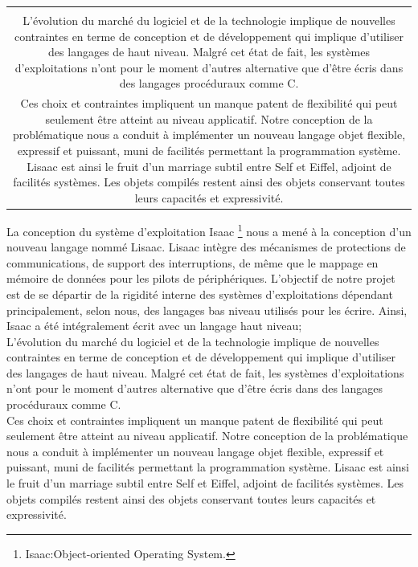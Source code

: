 \documentclass[11pt]{mybook}
\newcommand{\isaac}{I{\sc{}saac} }
\newcommand{\fr}[1]{
  \if \frenchversion 1
    \if \englishversion 1    
    \vspace{2mm}
    \noindent\begin{tabular}{|c}
      {
        \begin{minipage}{15.5cm}
          \textit{#1}
        \end{minipage}
      }
    \end{tabular}
    \else
    #1
    \fi
  \fi
}
\begin{document}
\fr{La conception du syst\`eme
d'exploitation \isaac \footnote{Isaac:Object-oriented Operating
System.} nous a men\'e \`a la conception d'un nouveau langage nomm\'e
Lisaac. 
Lisaac int\`egre des m\'ecanismes de protections de communications, de
support des interruptions, de m\^eme que le mappage en m\'emoire de
donn\'ees pour les pilots de p\'eriph\'eriques. 
L'objectif de notre projet est de se d\'epartir de la rigidit\'e interne
des syst\`emes d'exploitations d\'ependant principalement, selon nous, des
langages bas niveau utilis\'es pour les \'ecrire.
Ainsi, Isaac a \'et\'e int\'egralement \'ecrit avec un langage haut niveau;
\\
L'\'evolution du march\'e du logiciel et de la technologie implique de
nouvelles contraintes en terme de conception 
et de d\'eveloppement qui implique d'utiliser des langages de haut niveau.
Malgr\'e cet \'etat de fait, les syst\`emes d'exploitations n'ont pour le
moment d'autres alternative que d'\^etre \'ecris dans des langages
proc\'eduraux comme C.
\\
Ces choix et contraintes impliquent un manque patent de
flexibilit\'e qui peut seulement \^etre atteint au niveau applicatif.
Notre conception de la probl\'ematique nous a conduit \`a impl\'ementer
un nouveau langage objet flexible, expressif et puissant, 
muni de facilit\'es permettant la programmation syst\`eme.
Lisaac est ainsi le fruit d'un marriage subtil entre Self et Eiffel,
adjoint de facilit\'es syst\`emes. 
Les objets compil\'es restent ainsi des objets conservant toutes leurs
capacit\'es et expressivit\'e. 
}
\end{document}
